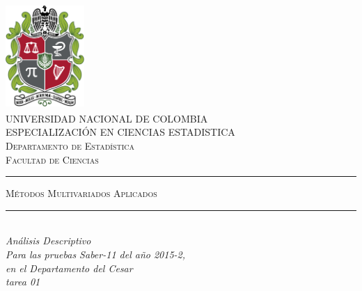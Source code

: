 \documentclass[12pt,a4paper,]{book}
\title{}
\author{}
\date{}
\numberwithin{dummy}{section}
\theoremstyle{ocrenumbox}
\theoremstyle{ocrenumbox}
\theoremstyle{ocrenumbox}
\theoremstyle{ocrenumbox}
\theoremstyle{ocrenum}
\begin{document}
\begin{titlepage}

\newcommand{\HRule}{\rule{\linewidth}{0.5mm}} %

\center %


\begin{minipage}{13.5cm}
\center

\includegraphics[width=3cm,height=4cm]{logo}\\[0.5cm] %


\textsc{\Large UNIVERSIDAD NACIONAL DE COLOMBIA \\[1.0cm]
{\large ESPECIALIZACIÓN EN CIENCIAS ESTADISTICA\\[0.5cm]
Departamento de Estadística\\[0.2cm]
Facultad de Ciencias}}\\[2cm]



\rule[1.7mm]{1cm}{0.5mm}
\hfill
\textsc{\Large Métodos Multivariados Aplicados}
\hfill
\rule[1.7mm]{1cm}{0.5mm}
\\[0.2cm]

{\Large
\textit{Análisis Descriptivo \\
Para las pruebas Saber-11 del año 2015-2, \\
en el Departamento del Cesar \\
tarea 01}
}\\[0.2cm]


\end{minipage}
\end{titlepage}
\end{document}
